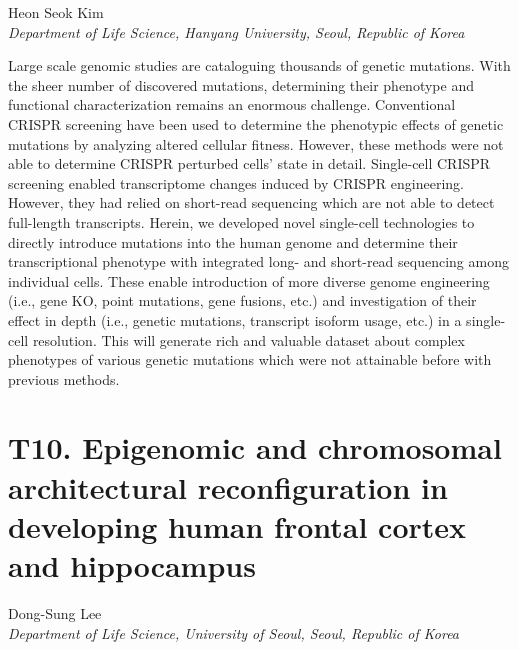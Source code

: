 \begin{center}
Heon Seok Kim \\
\vspace{0.3cm}
\textit{Department of Life Science, Hanyang University, Seoul, Republic of Korea} \\
\end{center}

\noindent
Large scale genomic studies are cataloguing thousands of genetic mutations. With the sheer number of discovered mutations, determining their phenotype and functional characterization remains an enormous challenge. Conventional CRISPR screening have been used to determine the phenotypic effects of genetic mutations by analyzing altered cellular fitness. However, these methods were not able to determine CRISPR perturbed cells’ state in detail. Single-cell CRISPR screening enabled transcriptome changes induced by CRISPR engineering. However, they had relied on short-read sequencing which are not able to detect full-length transcripts. Herein, we developed novel single-cell technologies to directly introduce mutations into the human genome and determine their transcriptional phenotype with integrated long- and short-read sequencing among individual cells. These enable introduction of more diverse genome engineering (i.e., gene KO, point mutations, gene fusions, etc.) and investigation of their effect in depth (i.e., genetic mutations, transcript isoform usage, etc.) in a single-cell resolution. This will generate rich and valuable dataset about complex phenotypes of various genetic mutations which were not attainable before with previous methods.
\newpage





\section*{T10. Epigenomic and chromosomal architectural reconfiguration in developing human frontal cortex and hippocampus}

\begin{center}
Dong-Sung Lee \\
\vspace{0.3cm}
\textit{Department of Life Science, University of Seoul, Seoul, Republic of Korea} \\
\end{center}


